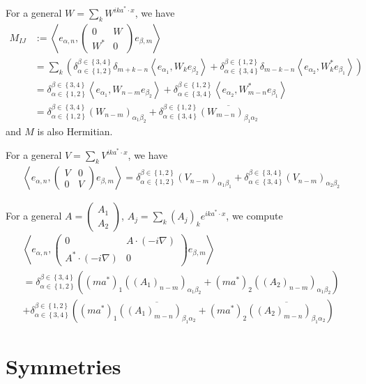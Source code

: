 \documentclass[11pt,a4paper,reqno,french,tikz]{amsart}
\newcommand{\pa}[1]{\left( #1 \right)} %
\newcommand{\acs}[1]{\left\{ #1 \right\}} %
\newcommand{\ps}[1]{\left< #1 \right>} %
\newcommand{\na}{\nabla} %
\newcommand{\mat}[1]{\begin{pmatrix} #1 \end{pmatrix}} %
\begin{document}
For a general $W = \sum_{k} W^{ik a^* \cdot x}$, we have
\begin{align*}
	M_{IJ} & := \ps{e_{\alpha,n}, \mat{0 & W \\ W^* & 0} e_{\beta,m}} \\
	       &= \sum_{k} \pa{\delta_{\alpha \in \acs{1,2}}^{\beta \in \acs{3,4}} \delta_{m+k-n} \ps{e_{\alpha_1},W_k e_{\beta_2}} + \delta_{\alpha \in \acs{3,4}}^{\beta \in \acs{1,2}}\delta_{m-k-n} \ps{e_{\alpha_2},W_k^* e_{\beta_1}}} \\
	       &=   \delta_{\alpha \in \acs{1,2}}^{\beta \in \acs{3,4}}\ps{e_{\alpha_1},W_{n-m} e_{\beta_2}} + \delta_{\alpha \in \acs{3,4}}^{\beta \in \acs{1,2}}\ps{e_{\alpha_2},W_{m-n}^* e_{\beta_1}} \\
	       &=     \delta_{\alpha \in \acs{1,2}}^{\beta \in \acs{3,4}}\pa{W_{n-m}}_{\alpha_1 \beta_2} + \delta_{\alpha \in \acs{3,4}}^{\beta \in \acs{1,2}} \overline{\pa{W_{m-n}}_{\beta_1\alpha_2} }
\end{align*}
and $M$ is also Hermitian.

For a general $V = \sum_{k} V^{ik a^* \cdot x}$, we have
\begin{align*}
	\ps{e_{\alpha,n},\mat{V & 0 \\ 0 & V} e_{\beta,m}} = \delta_{\alpha \in \acs{1,2}}^{\beta \in \acs{1,2}}\pa{V_{n-m}}_{\alpha_1 \beta_1} + \delta_{\alpha \in \acs{3,4}}^{\beta \in \acs{3,4}}\pa{V_{n-m}}_{\alpha_2 \beta_2}
\end{align*}

For a general $A = \mat{A_1 \\ A_2}$, $A_j = \sum_k \pa{A_j}_k e^{ika^*\cdot x}$, we compute
\begin{multline*}
\ps{e_{\alpha,n}, \mat{0 & A \cdot \pa{-i\na} \\A^* \cdot \pa{-i\na}  & 0} e_{\beta,m}} \\
= \delta_{\alpha \in \acs{1,2}}^{\beta \in \acs{3,4}} \pa{ \pa{ma^*}_1 \pa{\pa{A_1}_{n-m}}_{\alpha_1 \beta_2} + \pa{ma^*}_2 \pa{\pa{A_2}_{n-m}}_{\alpha_1 \beta_2}}\\
+ \delta_{\alpha \in \acs{3,4}}^{\beta \in \acs{1,2}} \pa{ \pa{ma^*}_1 \overline{\pa{\pa{A_1}_{m-n}}_{\beta_1 \alpha_2}} + \pa{ma^*}_2 \overline{\pa{\pa{A_2}_{m-n}}_{\beta_1 \alpha_2}}}
\end{multline*}


\section{Symmetries}%
\label{sec:symmetries}
\end{document}
